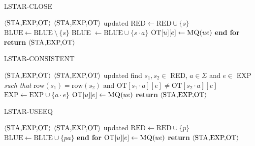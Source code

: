 \begin{algorithm}
\caption{LSTAR-CLOSE}\label{alg:lstar-close}
\begin{algorithmic}[1]
\Statex
\Input $\Braket{\text{STA,EXP,OT}}$
\Output $\Braket{\text{STA,EXP,OT}}$ updated
     \State $\text{RED} \gets \text{RED} \cup \{s\}$
     \State $\text{BLUE} \gets \text{BLUE} \: \setminus \: \{s\}$
      BLUE $\gets \text{BLUE} \cup \{s\cdot a\}$
     \EndFor
      $\text{OT}[u][e] \gets \Call{MQ}{ue}$
\EndFor
\EndFor
\State \textbf{end for}
\State \textbf{return} $\Braket{\text{STA,EXP,OT}}$
\end{algorithmic}
\end{algorithm}

\begin{algorithm}
\caption{LSTAR-CONSISTENT}\label{alg:lstar-consistent}
\begin{algorithmic}[1]
\Statex
\Input $\Braket{\text{STA,EXP,OT}}$
\Output $\Braket{\text{STA,EXP,OT}}$ updated
\State find $s_1, s_2 \in$ RED, $a \in \Sigma$ and $e \in$ EXP \textit{such that} row$(s_1) = \text{row}(s_2)$ and
\State $\text{OT}[s_1 \cdot a][e] \ne \text{OT}[s_2 \cdot a][e]$
\State $\text{EXP} \gets \text{EXP} \cup \{a \cdot e\}$ 
 $\text{OT}[u][e] \gets \Call{MQ}{ue}$
\EndFor
\State \textbf{return} $\Braket{\text{STA,EXP,OT}}$
\end{algorithmic}
\end{algorithm}

\begin{algorithm}
\caption{LSTAR-USEEQ}\label{alg:lstar-useeq}
\begin{algorithmic}[1]
\Statex
\Input $\Braket{\text{STA,EXP,OT}}$
\Output $\Braket{\text{STA,EXP,OT}}$ updated
     \State $\text{RED} \gets \text{RED} \cup \{p\}$
      $\text{BLUE} \gets \text{BLUE} \cup \{pa\}$ 
     \EndFor 
\EndFor
\State \textbf{end for}
 $\text{OT}[u][e] \gets \Call{MQ}{ue}$
\EndFor
\State \textbf{return} $\Braket{\text{STA,EXP,OT}}$
\end{algorithmic}
\end{algorithm}

